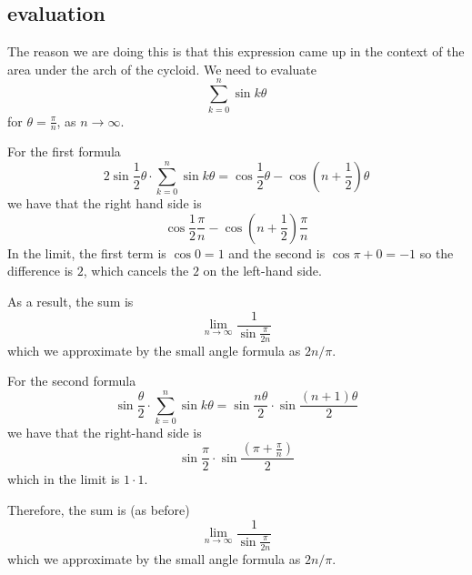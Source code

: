 \documentclass[11pt, oneside]{article}
\begin{document}
\subsection*{evaluation}

The reason we are doing this is that this expression came up in the context of the area under the arch of the cycloid.  We need to evaluate 
\[ \sum_{k=0}^n \sin k \theta \]
for $\theta = \frac \pi n$, as $n \rightarrow \infty$.

For the first formula
\[ 2 \sin {\frac 1 2} \theta  \cdot \sum_{k=0}^n \sin k \theta = \cos {\frac 1 2} \theta  - \cos (n +  {\frac 1 2}) \theta \]
we have that the right hand side is
\[ \cos {\frac 1 2} \frac \pi n  - \cos (n +  {\frac 1 2}) \frac \pi n \]
In the limit, the first term is $\cos 0 = 1$ and the second is $\cos \pi + 0 = - 1$ so the difference is $2$, which cancels the $2$ on the left-hand side.  

As a result, the sum is
\[ \lim_{n \rightarrow \infty} \frac 1 {\sin \frac \pi {2n}} \]
which we approximate by the small angle formula as $2n/\pi$.

For the second formula
\[ \sin \frac \theta 2 \cdot \sum_{k=0}^n \sin k \theta =  \sin \frac {n \theta} 2 \cdot \sin \frac {(n+1) \theta} 2  \]
we have that the right-hand side is
\[ \sin \frac \pi 2 \cdot \sin \frac {(\pi + \frac \pi n)} 2 \]
which in the limit is $1 \cdot 1$.

Therefore, the sum is (as before)
\[ \lim_{n \rightarrow \infty} \frac 1 {\sin \frac \pi {2n}} \]
which we approximate by the small angle formula as $2n/\pi$.
\end{document}
